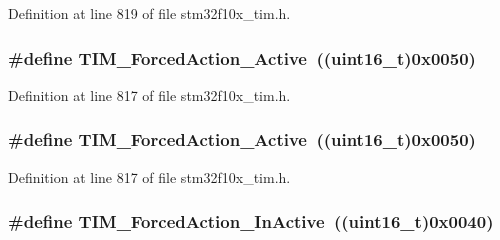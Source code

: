 Definition at line 819 of file stm32f10x\+\_\+tim.\+h.

\subsubsection[{\texorpdfstring{T\+I\+M\+\_\+\+Forced\+Action\+\_\+\+Active}{TIM_ForcedAction_Active}}]{\setlength{\rightskip}{0pt plus 5cm}\#define T\+I\+M\+\_\+\+Forced\+Action\+\_\+\+Active~(({\bf uint16\+\_\+t})0x0050)}\hypertarget{group___t_i_m___forced___action_ga19d3769825f1dfdbdbde3edb60310b99}{}\label{group___t_i_m___forced___action_ga19d3769825f1dfdbdbde3edb60310b99}


Definition at line 817 of file stm32f10x\+\_\+tim.\+h.

\subsubsection[{\texorpdfstring{T\+I\+M\+\_\+\+Forced\+Action\+\_\+\+Active}{TIM_ForcedAction_Active}}]{\setlength{\rightskip}{0pt plus 5cm}\#define T\+I\+M\+\_\+\+Forced\+Action\+\_\+\+Active~(({\bf uint16\+\_\+t})0x0050)}\hypertarget{group___t_i_m___forced___action_ga19d3769825f1dfdbdbde3edb60310b99}{}\label{group___t_i_m___forced___action_ga19d3769825f1dfdbdbde3edb60310b99}


Definition at line 817 of file stm32f10x\+\_\+tim.\+h.

\subsubsection[{\texorpdfstring{T\+I\+M\+\_\+\+Forced\+Action\+\_\+\+In\+Active}{TIM_ForcedAction_InActive}}]{\setlength{\rightskip}{0pt plus 5cm}\#define T\+I\+M\+\_\+\+Forced\+Action\+\_\+\+In\+Active~(({\bf uint16\+\_\+t})0x0040)}\hypertarget{group___t_i_m___forced___action_ga79656f2193ec5e12a15d0ae5b025d273}{}\label{group___t_i_m___forced___action_ga79656f2193ec5e12a15d0ae5b025d273}


